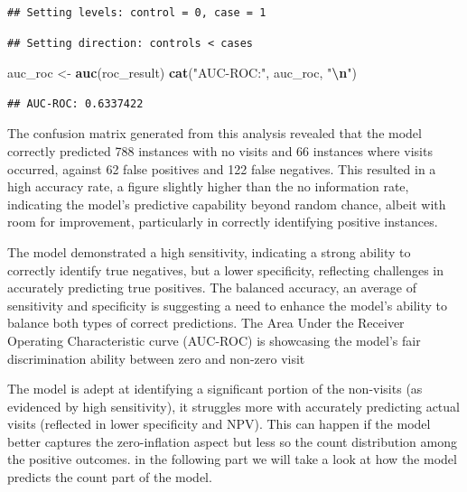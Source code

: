 \documentclass[
]{article}
\newenvironment{Shaded}{\begin{snugshade}}{\end{snugshade}}
\newcommand{\FunctionTok}[1]{\textcolor[rgb]{0.13,0.29,0.53}{\textbf{#1}}}
\newcommand{\NormalTok}[1]{#1}
\newcommand{\OtherTok}[1]{\textcolor[rgb]{0.56,0.35,0.01}{#1}}
\newcommand{\SpecialCharTok}[1]{\textcolor[rgb]{0.81,0.36,0.00}{\textbf{#1}}}
\newcommand{\StringTok}[1]{\textcolor[rgb]{0.31,0.60,0.02}{#1}}
\begin{document}
\begin{verbatim}
## Setting levels: control = 0, case = 1
\end{verbatim}

\begin{verbatim}
## Setting direction: controls < cases
\end{verbatim}

\begin{Shaded}
\begin{Highlighting}[]
\NormalTok{auc\_roc }\OtherTok{\textless{}{-}} \FunctionTok{auc}\NormalTok{(roc\_result)}
\FunctionTok{cat}\NormalTok{(}\StringTok{"AUC{-}ROC:"}\NormalTok{, auc\_roc, }\StringTok{"}\SpecialCharTok{\textbackslash{}n}\StringTok{"}\NormalTok{)}
\end{Highlighting}
\end{Shaded}

\begin{verbatim}
## AUC-ROC: 0.6337422
\end{verbatim}

The confusion matrix generated from this analysis revealed that the
model correctly predicted 788 instances with no visits and 66 instances
where visits occurred, against 62 false positives and 122 false
negatives. This resulted in a high accuracy rate, a figure slightly
higher than the no information rate, indicating the model's predictive
capability beyond random chance, albeit with room for improvement,
particularly in correctly identifying positive instances.

The model demonstrated a high sensitivity, indicating a strong ability
to correctly identify true negatives, but a lower specificity,
reflecting challenges in accurately predicting true positives. The
balanced accuracy, an average of sensitivity and specificity is
suggesting a need to enhance the model's ability to balance both types
of correct predictions. The Area Under the Receiver Operating
Characteristic curve (AUC-ROC) is showcasing the model's fair
discrimination ability between zero and non-zero visit

The model is adept at identifying a significant portion of the
non-visits (as evidenced by high sensitivity), it struggles more with
accurately predicting actual visits (reflected in lower specificity and
NPV). This can happen if the model better captures the zero-inflation
aspect but less so the count distribution among the positive outcomes.
in the following part we will take a look at how the model predicts the
count part of the model.
\end{document}
